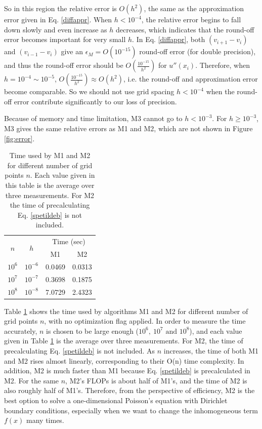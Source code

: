 \documentclass{article}
\begin{document}
	So in this region the relative error is $O(h^2)$, the same as the approximation error given in Eq. \ref{diffappr}. 
	When $h<10^{-4}$, the relative error begins to fall down slowly and even increase as $h$ decreases, 
	which indicates that the round-off error becomes important for very small $h$. 
	In Eq. \ref{diffappr}, both $(v_{i+1}-v_i)$ and $(v_{i-1}-v_i)$ give an $\epsilon_M=O(10^{-15})$ 
	round-off error (for double precision), 
	and thus the round-off error should be $O(\frac{10^{-15}}{h^2})$ for $u''(x_i)$. 
	Therefore, when $h=10^{-4}\sim 10^{-5}$, $O(\frac{10^{-15}}{h^2})\approx O(h^2)$, i.e. 
	the round-off and approximation error become comparable. 
	So we should not use grid spacing $h<10^{-4}$ when the round-off error contribute significantly to our loss of precision. 
	\par
	Because of memory and time limitation, M3 cannot go to $h<10^{-3}$. 
	For $h\geq 10^{-3}$, M3 gives the same relative errors as M1 and M2, which are not shown in Figure \ref{fig:error}. 
	\par
	\begin{table}[tb]
		\centering
		\caption{Time used by M1 and M2 for different number of grid points $n$. 
		Each value given in this table is the average over three measurements. 
	    For M2 the time of precalculating Eq. \ref{spetildeb} is not included. }
		\begin{tabular}{cccc}
			\hline
			\hline
			\multirow{2}{*}{$n$} &\multirow{2}{*}{$h$}& \multicolumn{2}{c}{Time (sec)}\\
			& & M1 & M2  \\
			\hline
			$10^6$&$10^{-6}$&0.0469 & 0.0313 \\
			$10^7$&$10^{-7}$&0.3698 & 0.1875\\
			$10^8$&$10^{-8}$&7.0729 & 2.4323\\
			\hline
			\hline
		\end{tabular}
		\label{table:time}
	\end{table}
	Table \ref{table:time} shows the time used by algorithms M1 and M2 for different number of grid points $n$, 
	with no optimization flag applied. 
	In order to measure the time accurately, $n$ is chosen to be large enough ($10^6,\ 10^7\text{ and }10^8$), 
	and each value given in Table \ref{table:time} is the average over three measurements. 
	For M2, the time of precalculating Eq. \ref{spetildeb} is not included. 
	As $n$ increases, the time of both M1 and M2 rises almost linearly, corresponding to their O(n) time complexity. 
	In addition, M2 is much faster than M1 because Eq. \ref{spetildeb} is precalculated in M2. 
	For the same $n$, M2's FLOPs is about half of M1's, and the time of M2 is also roughly half of M1's. 
	Therefore, from the perspective of efficiency, 
	M2 is the best option to solve a one-dimensional Poisson's equation with Dirichlet boundary conditions, 
	especially when we want to change the inhomogeneous term $f(x)$ many times. 
	
\end{document}
